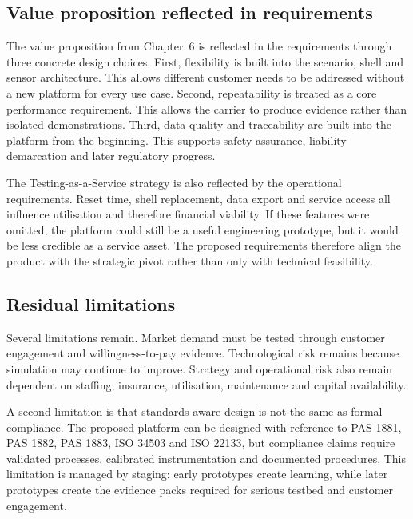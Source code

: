 \subsection{Value proposition reflected in requirements}
\label{sec:ch8_value_reflected_in_requirements}

The value proposition from Chapter~6 is reflected in the requirements through three concrete design choices. First, flexibility is built into the scenario, shell and sensor architecture. This allows different customer needs to be addressed without a new platform for every use case. Second, repeatability is treated as a core performance requirement. This allows the carrier to produce evidence rather than isolated demonstrations. Third, data quality and traceability are built into the platform from the beginning. This supports safety assurance, liability demarcation and later regulatory progress.

The Testing-as-a-Service strategy is also reflected by the operational requirements. Reset time, shell replacement, data export and service access all influence utilisation and therefore financial viability. If these features were omitted, the platform could still be a useful engineering prototype, but it would be less credible as a service asset. The proposed requirements therefore align the product with the strategic pivot rather than only with technical feasibility.

\subsection{Residual limitations}
\label{sec:ch8_residual_limitations}

Several limitations remain. Market demand must be tested through customer engagement and willingness-to-pay evidence. Technological risk remains because simulation may continue to improve. Strategy and operational risk also remain dependent on staffing, insurance, utilisation, maintenance and capital availability.

A second limitation is that standards-aware design is not the same as formal compliance. The proposed platform can be designed with reference to PAS 1881, PAS 1882, PAS 1883, ISO 34503 and ISO 22133, but compliance claims require validated processes, calibrated instrumentation and documented procedures. This limitation is managed by staging: early prototypes create learning, while later prototypes create the evidence packs required for serious testbed and customer engagement.

